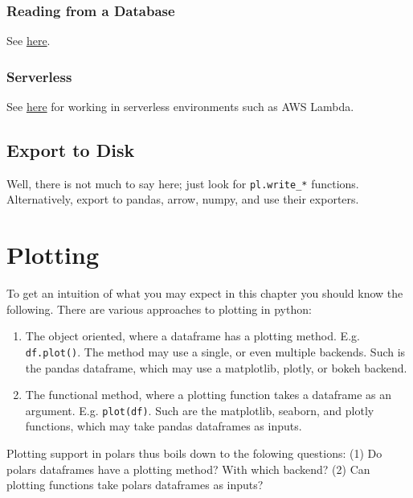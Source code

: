 \documentclass[
  letterpaper,
  DIV=11,
  numbers=noendperiod]{scrartcl}
\providecommand{\tightlist}{%
  \setlength{\itemsep}{0pt}\setlength{\parskip}{0pt}}\usepackage{longtable,booktabs,array}
\begin{document}
\hypertarget{reading-from-a-database}{%
\subsubsection{Reading from a Database}\label{reading-from-a-database}}

See
\href{https://pola-rs.github.io/polars-book/user-guide/howcani/io/read_db.html}{here}.

\hypertarget{serverless}{%
\subsubsection{Serverless}\label{serverless}}

See \href{https://www.rhosignal.com/posts/polars-aws-lambda/}{here} for
working in serverless environments such as AWS Lambda.

\hypertarget{sec-disk-export}{%
\subsection{Export to Disk}\label{sec-disk-export}}

Well, there is not much to say here; just look for \texttt{pl.write\_*}
functions. Alternatively, export to pandas, arrow, numpy, and use their
exporters.

\hypertarget{plotting}{%
\section{Plotting}\label{plotting}}

To get an intuition of what you may expect in this chapter you should
know the following. There are various approaches to plotting in python:

\begin{enumerate}
\def\labelenumi{\arabic{enumi}.}
\tightlist
\item
  The object oriented, where a dataframe has a plotting method. E.g.
  \texttt{df.plot()}. The method may use a single, or even multiple
  backends. Such is the pandas dataframe, which may use a matplotlib,
  plotly, or bokeh backend.
\item
  The functional method, where a plotting function takes a dataframe as
  an argument. E.g. \texttt{plot(df)}. Such are the matplotlib, seaborn,
  and plotly functions, which may take pandas dataframes as inputs.
\end{enumerate}

Plotting support in polars thus boils down to the folowing questions:
(1) Do polars dataframes have a plotting method? With which backend? (2)
Can plotting functions take polars dataframes as inputs?
\end{document}
